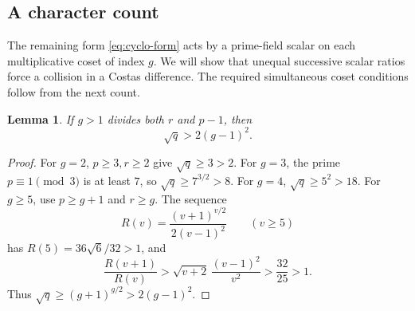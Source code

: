 \documentclass[11pt]{article}
\newtheorem{lemma}[theorem]{Lemma}
\theoremstyle{definition}
\theoremstyle{remark}
\numberwithin{equation}{section}
\begin{document}
\subsection{A character count}

The remaining form \eqref{eq:cyclo-form} acts by a prime-field scalar
on each multiplicative coset of index \(g\). We will show that unequal
successive scalar ratios force a collision in a Costas difference.
The required simultaneous coset conditions follow from the next count.

\begin{lemma}\label{lem:size}
If \(g>1\) divides both \(r\) and \(p-1\), then
\[
 \sqrt q>2(g-1)^2.
\]
\end{lemma}
\begin{proof}
For \(g=2\), \(p\ge3,r\ge2\) give \(\sqrt q\ge3>2\).
For \(g=3\), the prime \(p\equiv1\pmod3\) is at least \(7\),
so \(\sqrt q\ge7^{3/2}>8\).
For \(g=4\), \(\sqrt q\ge5^2>18\).
For \(g\ge5\), use \(p\ge g+1\) and \(r\ge g\).
The sequence
\[
 R(v)=\frac{(v+1)^{v/2}}{2(v-1)^2}\qquad(v\ge5)
\]
has \(R(5)=36\sqrt6/32>1\), and
\[
 \frac{R(v+1)}{R(v)}
 >\sqrt{v+2}\,\frac{(v-1)^2}{v^2}
 >\frac{32}{25}>1.
\]
Thus \(\sqrt q\ge(g+1)^{g/2}>2(g-1)^2\).
\end{proof}
\end{document}
